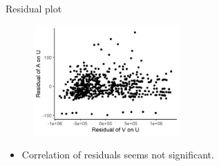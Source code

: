\documentclass[aspectratio=169]{beamer}
\begin{document}
\begin{frame}{Residual plot}
    \begin{figure}[!ht]
  \begin{center}
  \includegraphics[width = 0.50\textwidth]
  {figuretable/residual_plot_month_aggregate.png}
  \end{center}
  \footnotesize
\end{figure} 
\begin{itemize}
    \item Correlation of residuals seems not significant.
\end{itemize}
\end{frame}
\end{document}
